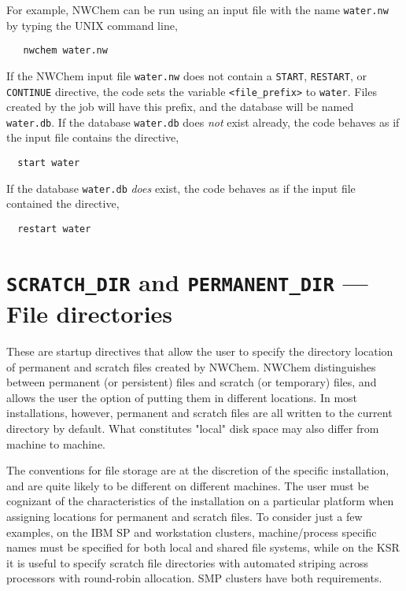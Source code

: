 For example, NWChem can be run using an input file with the name 
\verb+water.nw+ 
by typing the UNIX command line,

\begin{verbatim}
   nwchem water.nw
\end{verbatim}

If the NWChem input file \verb+water.nw+ does not contain
a \verb+START+, \verb+RESTART+, or \verb+CONTINUE+ directive, the code
sets the variable {\tt <file\_prefix>} to {\tt water}.  Files created
by the job will have this prefix, and the database will be named
{\tt water.db}.  If the database \verb+water.db+ does {\it not} exist already,
the code behaves as if the input file contains the directive,

\begin{verbatim}
  start water
\end{verbatim}

If the database \verb+water.db+ {\it does} exist,
the code behaves as if the input file contained the directive,

\begin{verbatim}
  restart water
\end{verbatim}


\section{{\tt SCRATCH\_DIR} and {\tt PERMANENT\_DIR} --- File directories}
\label{sec:dirs}


These are startup directives that allow the user to specify the
directory location of permanent and scratch files created by NWChem.
NWChem distinguishes between permanent (or persistent) files and
scratch (or temporary) files, and allows the user the option of
putting them in different locations.  In most installations, however,
permanent and scratch files are all written to the current directory
by default.  What constitutes "local" disk space may also differ from 
machine to machine.

The conventions for file storage are at the discretion of the specific 
installation, and are quite likely to be different on different machines.  
The user must be cognizant of the characteristics of the installation
on a particular platform when assigning locations for permanent and
scratch files.  To consider just a few examples, on the IBM SP 
and workstation clusters, machine/process
specific names must be specified for both local and shared file
systems, while on the KSR it is useful to specify scratch file directories
with automated striping across processors with round-robin allocation.
SMP clusters have both requirements.  

